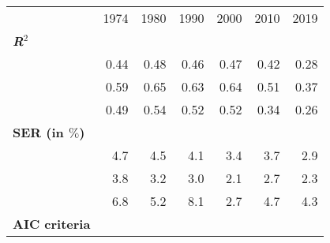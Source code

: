 \begin{tabular}{lllllll}
\cline{1-7}
\multicolumn{1}{c}{} &
  \multicolumn{1}{|r}{1974} &
  \multicolumn{1}{r}{1980} &
  \multicolumn{1}{r}{1990} &
  \multicolumn{1}{r}{2000} &
  \multicolumn{1}{r}{2010} &
  \multicolumn{1}{r}{2019} \\
\cline{1-7}
\multicolumn{1}{l}{\textbf{\textit{R}$^2$}} &
  \multicolumn{1}{|r}{} &
  \multicolumn{1}{r}{} &
  \multicolumn{1}{r}{} &
  \multicolumn{1}{r}{} &
  \multicolumn{1}{r}{} &
  \multicolumn{1}{r}{} \\
\multicolumn{1}{l}{\hspace{1em}{Model (A)}} &
  \multicolumn{1}{|r}{0.44} &
  \multicolumn{1}{r}{0.48} &
  \multicolumn{1}{r}{0.46} &
  \multicolumn{1}{r}{0.47} &
  \multicolumn{1}{r}{0.42} &
  \multicolumn{1}{r}{0.28} \\
\multicolumn{1}{l}{\hspace{1em}{Model (B)}} &
  \multicolumn{1}{|r}{0.59} &
  \multicolumn{1}{r}{0.65} &
  \multicolumn{1}{r}{0.63} &
  \multicolumn{1}{r}{0.64} &
  \multicolumn{1}{r}{0.51} &
  \multicolumn{1}{r}{0.37} \\
\multicolumn{1}{l}{\hspace{1em}{Model (C)}} &
  \multicolumn{1}{|r}{0.49} &
  \multicolumn{1}{r}{0.54} &
  \multicolumn{1}{r}{0.52} &
  \multicolumn{1}{r}{0.52} &
  \multicolumn{1}{r}{0.34} &
  \multicolumn{1}{r}{0.26} \\
\multicolumn{1}{l}{\textbf{SER (in $\%$)}} &
  \multicolumn{1}{|r}{} &
  \multicolumn{1}{r}{} &
  \multicolumn{1}{r}{} &
  \multicolumn{1}{r}{} &
  \multicolumn{1}{r}{} &
  \multicolumn{1}{r}{} \\
\multicolumn{1}{l}{\hspace{1em}{Model (A)}} &
  \multicolumn{1}{|r}{4.7} &
  \multicolumn{1}{r}{4.5} &
  \multicolumn{1}{r}{4.1} &
  \multicolumn{1}{r}{3.4} &
  \multicolumn{1}{r}{3.7} &
  \multicolumn{1}{r}{2.9} \\
\multicolumn{1}{l}{\hspace{1em}{Model (B)}} &
  \multicolumn{1}{|r}{3.8} &
  \multicolumn{1}{r}{3.2} &
  \multicolumn{1}{r}{3.0} &
  \multicolumn{1}{r}{2.1} &
  \multicolumn{1}{r}{2.7} &
  \multicolumn{1}{r}{2.3} \\
\multicolumn{1}{l}{\hspace{1em}{Model (C)}} &
  \multicolumn{1}{|r}{6.8} &
  \multicolumn{1}{r}{5.2} &
  \multicolumn{1}{r}{8.1} &
  \multicolumn{1}{r}{2.7} &
  \multicolumn{1}{r}{4.7} &
  \multicolumn{1}{r}{4.3} \\
\multicolumn{1}{l}{\textbf{AIC criteria}} &

\end{tabular}
